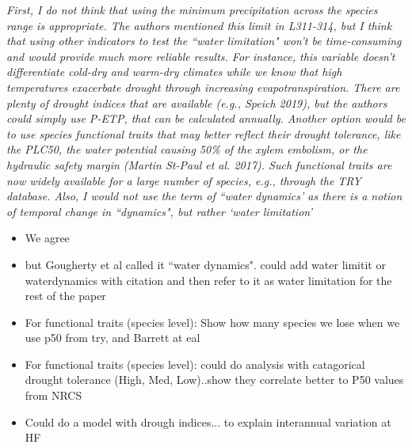 \documentclass{article}[11pt]
\begin{document}
\emph{First, I do not think that using the minimum precipitation across the species range is appropriate. The authors mentioned this limit in L311-314, but I think that using other indicators to test the ``water limitation" won't be time-consuming and would provide much more reliable results. For instance, this variable doesn't differentiate cold-dry and warm-dry climates while we know that high temperatures exacerbate drought through increasing evapotranspiration. There are plenty of drought indices that are available (e.g., Speich 2019), but the authors could simply use P-ETP, that can be calculated annually. Another option would be to use species functional traits that may better reflect their drought tolerance, like the PLC50, the water potential causing 50\% of the xylem embolism, or the hydraulic safety margin (Martin St-Paul et al. 2017). Such functional traits are now widely available for a large number of species, e.g., through the TRY database. Also, I would not use the term of ``water dynamics' as there is a notion of temporal change in ``dynamics", but rather `water limitation'}
\begin{itemize}
\item We agree
\item but Gougherty et al called it ``water dynamics". could add water limitit or waterdynamics  with citation and then refer to it as water limitation for the rest of the paper
\item For functional traits (species level): Show how many species we lose when we use p50 from try, and Barrett at eal
\item For functional traits (species level): could do analysis with catagorical drought tolerance (High, Med, Low)..show they correlate better to P50 values from NRCS
\item Could do a model with drough indices... to explain interannual variation at HF
\end{itemize}
\end{document}
